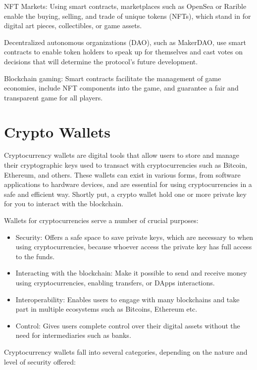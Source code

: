 NFT Markets: Using smart contracts, marketplaces such as OpenSea or Rarible enable the buying, selling, and trade of unique tokens (NFTs), which stand in for digital art pieces, collectibles, or game assets.

 Decentralized autonomous organizations (DAO), such as MakerDAO, use smart contracts to enable token holders to speak up for themselves and cast votes on decisions that will determine the protocol's future development.
 
 Blockchain gaming: Smart contracts facilitate the management of game economies, include NFT components into the game, and guarantee a fair and transparent game for all players.
 
 \section{Crypto Wallets}
 \label{sec:ch2sec4}
\par  Cryptocurrency wallets are digital tools that allow users to store and manage their cryptographic keys used to transact with cryptocurrencies such as Bitcoin, Ethereum, and others. These wallets can exist in various forms, from software applications to hardware devices, and are essential for using cryptocurrencies in a safe and efficient way. Shortly put, a crypto wallet hold one or more private key for you to interact with the blockchain.
\par Wallets for cryptocurrencies serve a number of crucial purposes:
\begin{itemize}
	\item Security: Offers a safe space to save private keys, which are necessary to when using cryptocurrencies, because whoever access the private key has full access to the funds.
	\item Interacting with the blockchain: Make it possible to send and receive money using cryptocurrencies, enabling transfers, or DApps interactions.
	\item Interoperability: Enables users to engage with many blockchains and take part in multiple ecosystems such as Bitcoins, Ethereum etc.
	\item Control: Gives users complete control over their digital assets without the need for intermediaries such as banks.
\end{itemize}
\par Cryptocurrency wallets fall into several categories, depending on the nature and level of security offered:
